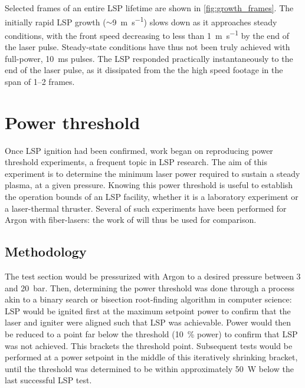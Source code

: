             

            Selected frames of an entire LSP lifetime are shown in \autoref{fig:growth_frames}. The initially rapid LSP growth ($\sim$\qty{9}{m.s^{-1}}) slows down as it approaches steady conditions, with the front speed decreasing to less than \qty{1}{m.s^{-1}} by the end of the laser pulse. Steady-state conditions have thus not been truly achieved with full-power, \qty{10}{ms} pulses. The LSP responded practically instantaneously to the end of the laser pulse, as it dissipated from the the high speed footage in the span of 1--2 frames.
            
            
    \clearpage
    \section{Power threshold} \label{sec:results_powerthreshold}
        Once LSP ignition had been confirmed, work began on reproducing power threshold experiments, a frequent topic in LSP research. The aim of this experiment is to determine the minimum laser power required to sustain a steady plasma, at a given pressure. Knowing this power threshold is useful to establish the operation bounds of an LSP facility, whether it is a laboratory experiment or a laser-thermal thruster. Several of such experiments have been performed for Argon with fiber-lasers: the work of \textcite{zimakovInteractionNearIRLaser2016, matsuiGeneratingConditionsArgon2019,luCharacteristicDiagnosticsLaserStabilized2022} will thus be used for comparison.
        
        \subsection{Methodology}
            The test section would be pressurized with Argon to a desired pressure between 3 and 20~bar. Then, determining the power threshold was done through a process akin to a binary search or bisection root-finding algorithm in computer science: LSP would be ignited first at the maximum setpoint power to confirm that the laser and igniter were aligned such that LSP was achievable. Power would then be reduced to a point far below the threshold (10~\% power) to confirm that LSP was not achieved. This brackets the threshold point. Subsequent tests would be performed at a power setpoint in the middle of this iteratively shrinking bracket, until the threshold was determined to be within approximately \qty{50}{W} below the last successful LSP test.

